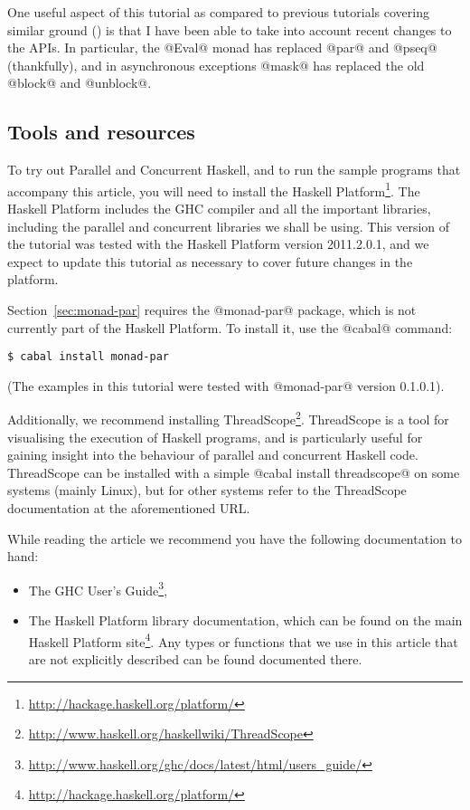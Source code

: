 \documentclass[11pt,a4paper]{article}
\let\cite=\citep
\newcommand{\Subsection}[2]{\subsection{#2}\label{sec:#1}}
\newcommand{\secref}[1]{Section~\ref{sec:#1}}
\begin{document}
One useful aspect of this tutorial as compared to previous tutorials
covering similar ground (\cite{awkward,pjsingh-tutorial}) is that I have been
able to take into account recent changes to the APIs.  In particular,
the @Eval@ monad has replaced @par@ and @pseq@ (thankfully), and in
asynchronous exceptions @mask@ has replaced the old @block@ and
@unblock@.

\Subsection{tools}{Tools and resources}

To try out Parallel and Concurrent Haskell, and to run the sample
programs that accompany this article, you will need to install the
Haskell Platform\footnote{\url{http://hackage.haskell.org/platform/}}.
The Haskell Platform includes the GHC compiler and all the important
libraries, including the parallel and concurrent libraries we shall be
using.  This version of the tutorial was tested with the Haskell
Platform version 2011.2.0.1, and we expect to update this tutorial as
necessary to cover future changes in the platform.

\secref{monad-par} requires the @monad-par@ package, which is not
currently part of the Haskell Platform.  To install it, use the
@cabal@ command:

{\small \begin{verbatim}
$ cabal install monad-par
\end{verbatim}}

\noindent (The examples in this tutorial were tested with @monad-par@ version 0.1.0.1).

Additionally, we recommend installing
ThreadScope\footnote{\url{http://www.haskell.org/haskellwiki/ThreadScope}}.
ThreadScope is a tool for visualising the execution of Haskell
programs, and is particularly useful for gaining insight into the
behaviour of parallel and concurrent Haskell code.  ThreadScope can be
installed with a simple @cabal install threadscope@ on some systems
(mainly Linux), but for other systems refer to the ThreadScope
documentation at the aforementioned URL.

While reading the article we recommend you have the following
documentation to hand:

\begin{itemize}
\item The GHC User's
  Guide\footnote{\url{http://www.haskell.org/ghc/docs/latest/html/users_guide/}},

\item The Haskell Platform library documentation, which can be found
  on the main Haskell Platform
  site\footnote{\url{http://hackage.haskell.org/platform/}}.  Any
  types or functions that we use in this article that are not
  explicitly described can be found documented there.
\end{itemize}
\end{document}
